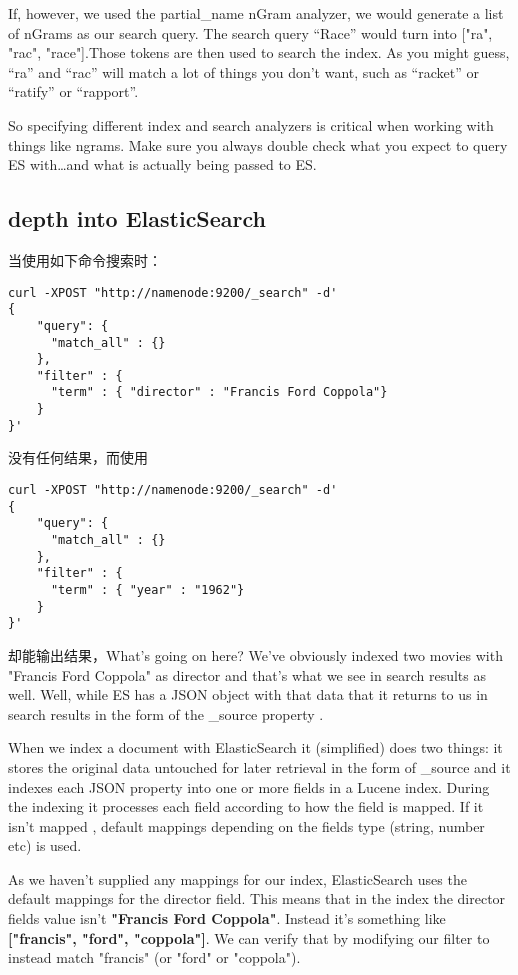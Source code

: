 \par If, however, we used the partial\_name nGram analyzer, we would generate a list of nGrams as our search query. The search query “Race” would turn into ["ra", "rac", "race"].Those tokens are then used to search the index. As you might guess, “ra” and “rac” will match a lot of things you don’t want, such as “racket” or “ratify” or “rapport”.
\par So specifying different index and search analyzers is critical when working with things like ngrams. Make sure you always double check what you expect to query ES with…and what is actually being passed to ES.
\subsection{depth into ElasticSearch}
\par 当使用如下命令搜索时：
\begin{verbatim}
curl -XPOST "http://namenode:9200/_search" -d'
{
    "query": {
      "match_all" : {}
    },
    "filter" : {
      "term" : { "director" : "Francis Ford Coppola"}
    }
}'
\end{verbatim}
没有任何结果，而使用
\begin{verbatim}
curl -XPOST "http://namenode:9200/_search" -d'
{
    "query": {
      "match_all" : {}
    },
    "filter" : {
      "term" : { "year" : "1962"}
    }
}'
\end{verbatim}
\par 却能输出结果，What's going on here?  We've obviously indexed two movies with "Francis Ford Coppola" as director and that's what we see in search results as well. Well, while ES has a JSON object with that data that it returns to us in search results in the form of the \_source property .
\par When we index a document with ElasticSearch it (simplified) does two things: it stores the original data untouched for later retrieval in the form of \_source and it indexes each JSON property into one or more fields in a Lucene index. During the indexing it processes each field according to how the field is mapped. If it isn't mapped , default mappings depending on the fields type (string, number etc) is used.
\par As we haven't supplied any mappings for our index, ElasticSearch uses the default mappings for the director field. This means that in the index the director fields value isn't \textbf{"Francis Ford Coppola"}. Instead it's something like \textbf{["francis", "ford", "coppola"]}. We can verify that by modifying our filter to instead match "francis" (or "ford" or "coppola").
